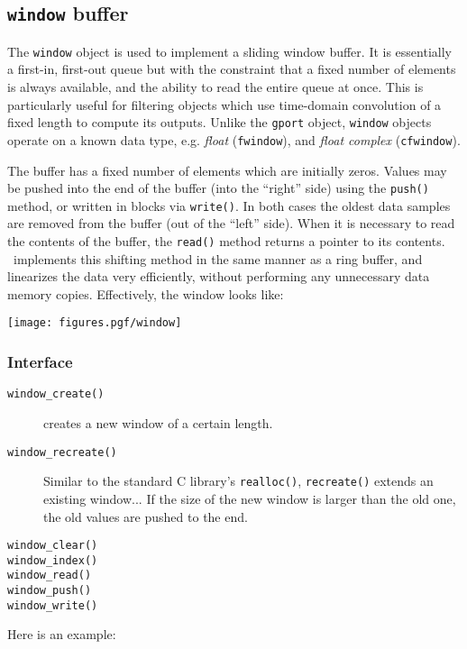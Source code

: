 \subsection{{\tt window} buffer}
\label{module:buffer:window}
The {\tt window} object is used to implement a sliding window buffer.
It is essentially a first-in, first-out queue but with the constraint that a
fixed number of elements is always available, and the ability to read the
entire queue at once.
This is particularly useful for filtering objects which use time-domain
convolution of a fixed length to compute its outputs.
Unlike the {\tt gport} object, {\tt window} objects operate on a known data
type, e.g.
{\it float} ({\tt fwindow}), and
{\it float complex} ({\tt cfwindow}).

The buffer has a fixed number of elements which are initially zeros.
Values may be pushed into the end of the buffer (into the ``right'' side)
using the {\tt push()} method, or written in blocks via {\tt write()}.
In both cases the oldest data samples are removed from the buffer (out of the
``left'' side).
When it is necessary to read the contents of the buffer, the {\tt read()}
method returns a pointer to its contents.
\liquid\ implements this shifting method in the same manner as a ring buffer,
and linearizes the data very efficiently, without performing any unnecessary
data memory copies.
Effectively, the window looks like:

\begin{centering}
\texttt{[image: figures.pgf/window]}
\end{centering}

\subsubsection{Interface}
\label{module:buffer:window:interface}

\begin{description}
\item[{\tt window\_create()}]
creates a new window of a certain length.

\item[{\tt window\_recreate()}]
Similar to the standard C library's {\tt realloc()}, {\tt recreate()} extends
an existing window...
If the size of the new window is larger than the old one, the old values are
pushed to the end.

\item[{\tt window\_clear()}]
\item[{\tt window\_index()}]
\item[{\tt window\_read()}]
\item[{\tt window\_push()}]
\item[{\tt window\_write()}]
\end{description}

Here is an example:


